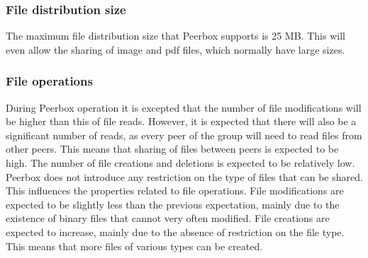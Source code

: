 \subsubsection{File distribution size}

The maximum file distribution size that Peerbox supports is 25 MB. This will even allow the sharing of image and pdf files, which normally have large sizes.

\subsubsection{File operations}

During Peerbox operation it is excepted that the number of file modifications will be higher than this of file reads. However, it is expected that there will also be a significant number of reads, as every peer of the group will need to read files from other peers. This means that sharing of files between peers is expected to be high. The number of file creations and deletions is expected to be relatively low.\\

Peerbox does not introduce any restriction on the type of files that can be shared. This influences the properties related to file operations. File modifications are expected to be slightly less than the previous expectation, mainly due to the existence of binary files that cannot very often modified. File creations are expected to increase, mainly due to the absence of restriction on the file type. This means that more files of various types can be created.